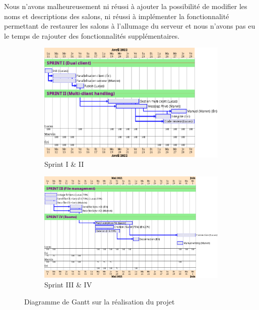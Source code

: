 \documentclass[a4paper,12pt]{article}
\begin{document}
Nous n'avons malheureusement ni réussi à ajouter la possibilité de modifier les noms et descriptions des salons, ni réussi à implémenter la fonctionnalité permettant de restaurer les salons à l'allumage du serveur et nous n'avons pas eu le temps de rajouter des fonctionnalités supplémentaires.

\begin{figure}[h!]
	\centering
	\vspace{0.4cm}
	\begin{subfigure}{\linewidth}
		\includegraphics[width=\linewidth]{gantt.png}
		\caption{Sprint I \& II}
	\end{subfigure}
	\begin{subfigure}{\linewidth}
		\includegraphics[width=\linewidth]{gantt2.png}
		\caption{Sprint III \& IV}
	\end{subfigure}
	\caption{Diagramme de Gantt sur la réalisation du projet}
	\label{fig:gantt}
	\hrulefill
\end{figure}
\pagebreak
\end{document}
